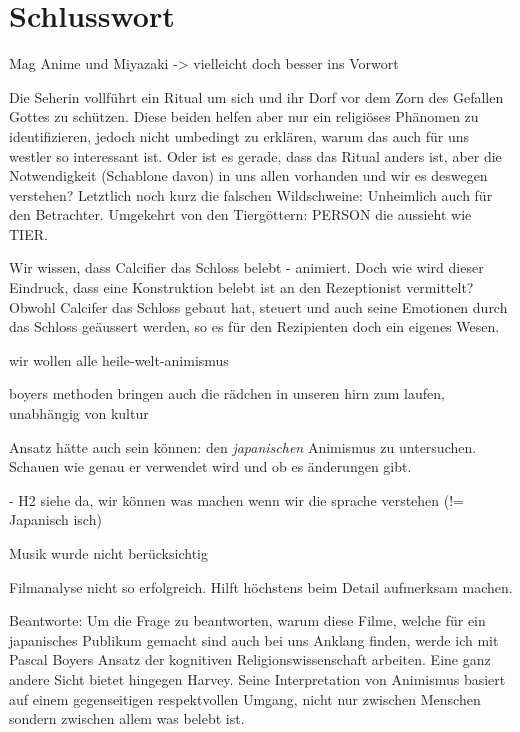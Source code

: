 \section*{Schlusswort}

Mag Anime und Miyazaki -> vielleicht doch besser ins Vorwort

Die Seherin vollführt ein Ritual um sich und ihr Dorf vor dem Zorn des Gefallen Gottes zu schützen. Diese beiden helfen aber nur ein religiöses Phänomen zu identifizieren, jedoch nicht umbedingt zu erklären, warum das auch für uns westler so interessant ist. Oder ist es gerade, dass das Ritual anders ist, aber die Notwendigkeit (Schablone davon) in uns allen vorhanden und wir es deswegen verstehen? Letztlich noch kurz die falschen Wildschweine: Unheimlich auch für den Betrachter. Umgekehrt von den Tiergöttern: PERSON die aussieht wie TIER.

Wir wissen, dass Calcifier das Schloss belebt - animiert. Doch wie wird dieser Eindruck, dass eine Konstruktion belebt ist an den Rezeptionist vermittelt?
Obwohl Calcifer das Schloss gebaut hat, steuert und auch seine Emotionen durch das Schloss geäussert werden, so es für den Rezipienten doch ein eigenes Wesen.

wir wollen alle heile-welt-animismus

boyers methoden bringen auch die rädchen in unseren hirn zum laufen, unabhängig von kultur

Ansatz hätte auch sein können: den \emph{japanischen} Animismus zu untersuchen. Schauen wie genau er verwendet wird und ob es änderungen gibt.

- H2 siehe da, wir können was machen wenn wir die sprache verstehen (!= Japanisch isch)

Musik wurde nicht berücksichtig

Filmanalyse nicht so erfolgreich. Hilft höchstens beim Detail aufmerksam machen.

Beantworte: Um die Frage zu beantworten, warum diese Filme, welche für ein japanisches Publikum gemacht sind auch bei uns Anklang finden, werde ich mit Pascal Boyers Ansatz der kognitiven Religionswissenschaft arbeiten. Eine ganz andere Sicht bietet hingegen Harvey. Seine Interpretation von Animismus basiert auf einem gegenseitigen respektvollen Umgang, nicht nur zwischen Menschen sondern zwischen allem was belebt ist.
